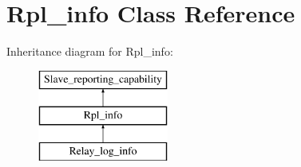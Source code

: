\hypertarget{classRpl__info}{}\section{Rpl\+\_\+info Class Reference}
\label{classRpl__info}
Inheritance diagram for Rpl\+\_\+info\+:\begin{figure}[H]
\begin{center}
\leavevmode
\includegraphics[height=3.000000cm]{classRpl__info}
\end{center}
\end{figure}

